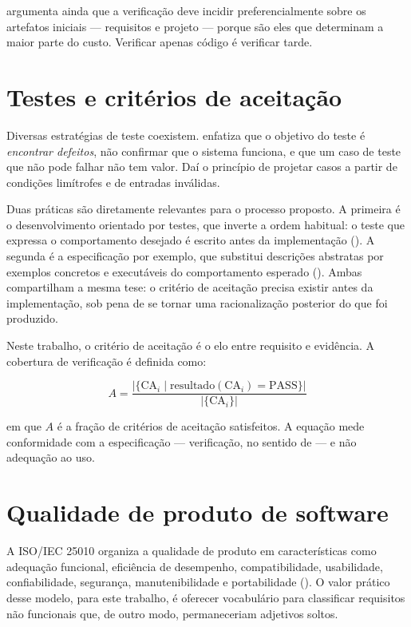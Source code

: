  argumenta ainda que a verificação deve incidir
preferencialmente sobre os artefatos iniciais --- requisitos e projeto --- porque
são eles que determinam a maior parte do custo. Verificar apenas código é
verificar tarde.

\section{Testes e critérios de aceitação}
\label{sec:testes}

Diversas estratégias de teste coexistem.  enfatiza que o
objetivo do teste é \emph{encontrar defeitos}, não confirmar que o sistema
funciona, e que um caso de teste que não pode falhar não tem valor. Daí o
princípio de projetar casos a partir de condições limítrofes e de entradas
inválidas.

Duas práticas são diretamente relevantes para o processo proposto. A primeira é o
desenvolvimento orientado por testes, que inverte a ordem habitual: o teste que
expressa o comportamento desejado é escrito antes da implementação
(). A segunda é a especificação por exemplo, que
substitui descrições abstratas por exemplos concretos e executáveis do
comportamento esperado (). Ambas compartilham a mesma tese:
o critério de aceitação precisa existir antes da implementação, sob pena de se
tornar uma racionalização posterior do que foi produzido.

Neste trabalho, o critério de aceitação é o elo entre requisito e evidência. A
cobertura de verificação é definida como:

\begin{equation}
	A = \frac{\left| \{ \mathrm{CA}_i \mid \mathrm{resultado}(\mathrm{CA}_i) = \mathrm{PASS} \} \right|}
	         {\left| \{ \mathrm{CA}_i \} \right|}
	\label{eq:cobertura}
\end{equation}

\noindent em que $A$ é a fração de critérios de aceitação satisfeitos. A equação
mede conformidade com a especificação --- verificação, no sentido de
 --- e não adequação ao uso.

\section{Qualidade de produto de software}
\label{sec:qualidade}

A ISO/IEC 25010 organiza a qualidade de produto em características como adequação
funcional, eficiência de desempenho, compatibilidade, usabilidade, confiabilidade,
segurança, manutenibilidade e portabilidade (). O valor
prático desse modelo, para este trabalho, é oferecer vocabulário para classificar
requisitos não funcionais que, de outro modo, permaneceriam adjetivos soltos.

